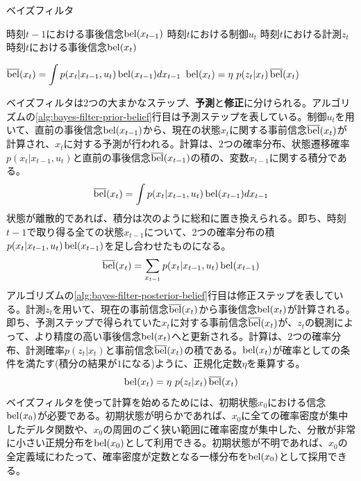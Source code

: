\documentclass[dvipdfmx,a4paper]{jsarticle}
\begin{document}
\begin{algorithm}[H]
	\caption{ベイズフィルタ}
	\label{alg:bayes-filter}
	\begin{algorithmic}[1]
		\Require
			\Statex 時刻$t - 1$における事後信念$\operatorname{bel}(x_{t - 1})$
			\Statex 時刻$t$における制御$u_t$
			\Statex 時刻$t$における計測$z_t$
		\Ensure
			\Statex 時刻$t$における事後信念$\operatorname{bel}(x_t)$ \newline
		
			\State $\operatorname{\overline{bel}}(x_t) = \displaystyle \int p(x_t | x_{t - 1}, u_t) \operatorname{bel}(x_{t - 1}) dx_{t - 1}$ \label{alg:bayes-filter-prior-belief}
			\State $\operatorname{bel}(x_t) = \eta \ p(z_t | x_t) \operatorname{\overline{bel}}(x_t)$ \label{alg:bayes-filter-posterior-belief}
		\EndFor
	\end{algorithmic}
\end{algorithm}

ベイズフィルタは2つの大まかなステップ、\textbf{予測}と\textbf{修正}に分けられる。アルゴリズムの\ref{alg:bayes-filter-prior-belief}行目は予測ステップを表している。制御$u_t$を用いて、直前の事後信念$\operatorname{bel}(x_{t - 1})$から、現在の状態$x_t$に関する事前信念$\operatorname{\overline{bel}}(x_t)$が計算され、$x_t$に対する予測が行われる。計算は、2つの確率分布、状態遷移確率$p(x_t | x_{t - 1}, u_t)$と直前の事後信念$\operatorname{\overline{bel}}(x_{t - 1})$の積の、変数$x_{t - 1}$に関する積分である。
\begin{equation}
	\operatorname{\overline{bel}}(x_t) = \int p(x_t | x_{t - 1}, u_t) \operatorname{bel}(x_{t - 1}) dx_{t - 1}
\end{equation}
状態が離散的であれば、積分は次のように総和に置き換えられる。即ち、時刻$t - 1$で取り得る全ての状態$x_{t - 1}$について、2つの確率分布の積$p(x_t | x_{t - 1}, u_t) \operatorname{bel}(x_{t - 1})$を足し合わせたものになる。
\begin{equation}
	\operatorname{\overline{bel}}(x_t) = \sum_{x_{t - 1}} p(x_t | x_{t - 1}, u_t) \operatorname{bel}(x_{t - 1})
\end{equation}
アルゴリズムの\ref{alg:bayes-filter-posterior-belief}行目は修正ステップを表している。計測$z_t$を用いて、現在の事前信念$\operatorname{\overline{bel}}(x_t)$から事後信念$\operatorname{bel}(x_t)$が計算される。即ち、予測ステップで得られていた$x_t$に対する事前信念$\operatorname{\overline{bel}}(x_t)$が、$z_t$の観測によって、より精度の高い事後信念$\operatorname{bel}(x_t)$へと更新される。計算は、2つの確率分布、計測確率$p(z_t | x_t)$と事前信念$\operatorname{\overline{bel}}(x_t)$の積である。$\operatorname{bel}(x_t)$が確率としての条件を満たす(積分の結果が$1$になる)ように、正規化定数$\eta$を乗算する。
\begin{equation}
	\operatorname{bel}(x_t) = \eta \ p(z_t | x_t) \operatorname{\overline{bel}}(x_t)
\end{equation}
ベイズフィルタを使って計算を始めるためには、初期状態$x_0$における信念$\operatorname{bel}(x_0)$が必要である。初期状態が明らかであれば、$x_0$に全ての確率密度が集中したデルタ関数や、$x_0$の周囲のごく狭い範囲に確率密度が集中した、分散が非常に小さい正規分布を$\operatorname{bel}(x_0)$として利用できる。初期状態が不明であれば、$x_0$の全定義域にわたって、確率密度が定数となる一様分布を$\operatorname{bel}(x_0)$として採用できる。\newline
\end{document}
